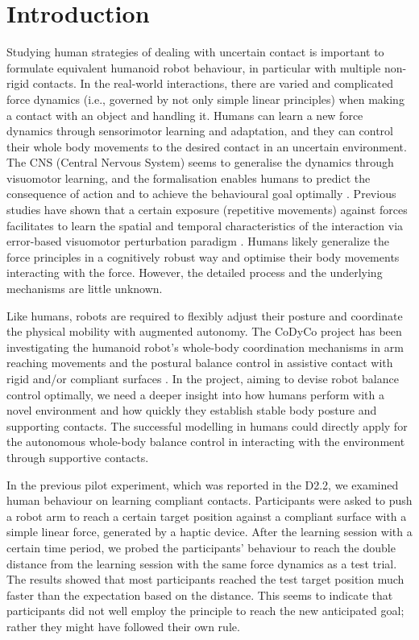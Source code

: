 
\section{Introduction}

Studying human strategies of dealing with uncertain contact is important to formulate equivalent humanoid robot behaviour, in particular with multiple non-rigid contacts. In the real-world interactions, there are varied and complicated force dynamics (i.e., governed by not only simple linear principles) when making a contact with an object and handling it. Humans can learn a new force dynamics through sensorimotor learning and adaptation, and they can control their whole body movements to the desired contact in an uncertain environment. The CNS (Central Nervous System) seems to generalise the dynamics through visuomotor learning, and the formalisation enables humans to predict the consequence of action and to achieve the behavioural goal optimally \cite{Wolpert2011, Davidson2003}. Previous studies have shown that a certain exposure (repetitive movements) against forces facilitates to learn the spatial and temporal characteristics of the interaction via error-based visuomotor perturbation paradigm \cite{Goodbody1998, Krakauer2006}. Humans likely generalize the force principles in a cognitively robust way and optimise their body movements interacting with the force. However, the detailed process and the underlying mechanisms are little unknown.

Like humans, robots are required to flexibly adjust their posture and coordinate the physical mobility with augmented autonomy. The CoDyCo project has been investigating the humanoid robot’s whole-body coordination mechanisms in arm reaching movements and the postural balance control in assistive contact with rigid and/or compliant surfaces \cite{Azad2015}. In the project, aiming to devise robot balance control optimally, we need a deeper insight into how humans perform with a novel environment and how quickly they establish stable body posture and supporting contacts. The successful modelling in humans could directly apply for the autonomous whole-body balance control in interacting with the environment through supportive contacts.

In the previous pilot experiment, which was reported in the D2.2, we examined human behaviour on learning compliant contacts. Participants were asked to push a robot arm to reach a certain target position against a compliant surface with a simple linear force, generated by a haptic device. After the learning session with a certain time period, we probed the participants’ behaviour to reach the double distance from the learning session with the same force dynamics as a test trial. The results showed that most participants reached the test target position much faster than the expectation based on the distance. This seems to indicate that participants did not well employ the principle to reach the new anticipated goal; rather they might have followed their own rule.

